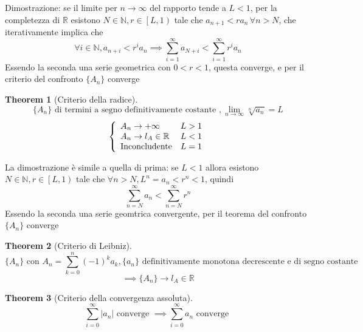 \documentclass{article}
\newtheorem{theorem}{Theorem}[section]
\begin{document}
        Dimostrazione: se il limite per $n \to \infty$ del rapporto tende a $L < 1$, 
        per la completezza di $\mathbb{R}$ esistono $N \in \mathbb{N}, r \in \left[\left.L, 1\right)\right.$
        tale che $a_{n+1} < ra_n \, \forall n > N$, che iterativamente implica che 
        $$\forall i \in \mathbb{N}, a_{n+i} < r^ia_n \implies \sum_{i=1}^\infty a_{N+i} < \sum_{i=1}^\infty r^ia_n$$
        Essendo la seconda una serie geometrica con $0 < r < 1$, questa converge, e per il criterio del confronto 
        $\{A_n\}$ converge
        \begin{theorem}[Criterio della radice]
            $$\{A_n\} \textrm{ di termini a segno definitivamente costante }, \lim_{n \to \infty}\sqrt[n]{a_n} = L$$
            \begin{equation}
                \left\{\begin{array}{l l}
                    A_n \to +\infty & L > 1 \\
                    A_n \to l_A \in \mathbb{R} & L < 1 \\
                    \textrm{Inconcludente} & L = 1 \\
                \end{array}\right.
            \end{equation}
        \end{theorem}
        La dimostrazione è simile a quella di prima: se $L < 1$ allora 
        esistono $N \in \mathbb{N}, r \in \left[\left.L, 1\right)\right.$ tale che 
        $\forall n > N, L^n = a_n < r^n < 1$, quindi 
        $$\sum_{n = N}^\infty a_n < \sum_{n=N}^\infty r^n$$ Essendo la 
        seconda una serie geomtrica convergente, per il teorema del confronto $\{A_n\}$ converge
    \begin{theorem}[Criterio di Leibniz]
        $$\{A_n\} \textrm{ con } A_n = \sum_{k=0}^n \left(-1\right)^ka_k, \{a_n\} \textrm{ definitivamente monotona decrescente e di segno costante }$$
        $$\implies \{A_n\} \to l_A \in \mathbb{R}$$
    \end{theorem}
    \begin{theorem}[Criterio della convergenza assoluta]
        $$\sum_{i=0}^\infty |a_n| \textrm{ converge } \implies \sum_{i=0}^\infty a_n \textrm{ converge }$$
    \end{theorem}
            
\end{document}
